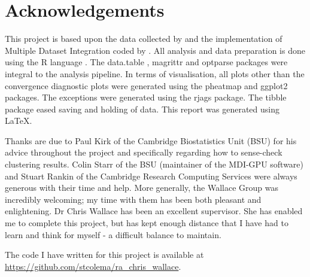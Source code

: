 \documentclass[12pt]{article} %
\begin{document}
	\newpage
	
	\section*{Acknowledgements}
	This project is based upon the data collected by \citet{TheInternationalIBDGeneticsConsortiumIBDriskloci2018} and the implementation of Multiple Dataset Integration coded by \citet{MasonMDIGPUacceleratingintegrative2016a}. All analysis and data preparation is done using the R language \citep{RCoreTeamLanguageEnvironmentStatistical2018}. The data.table \citep{DowleData.Table2019}, magrittr \citep{BacheMagrittr2014} and optparse \citep{DavisOptparse2019} packages were integral to the analysis pipeline. In terms of visualisation, all plots other than the convergence diagnostic plots were generated using the pheatmap \citep{KoldepheatmapPrettyHeatmaps2018} and ggplot2 \citep{WickhamGgplot22016} packages. The exceptions were generated using the rjags \citep{PlummerRjags2018} package. The tibble \citep{MullerTibble2019} package eased saving and holding of data. This report was generated using \LaTeX.
	
	Thanks are due to Paul Kirk of the Cambridge Biostatistics Unit (BSU) for his advice throughout the project and specifically regarding how to sense-check clustering results. Colin Starr of the BSU (maintainer of the MDI-GPU software) and Stuart Rankin of the Cambridge Research Computing Services were always generous with their time and help. More generally, the Wallace Group was incredibly welcoming; my time with them has been both pleasant and enlightening. Dr Chris Wallace has been an excellent supervisor. She has enabled me to complete this project, but has kept enough distance that I have had to learn and think for myself - a difficult balance to maintain.
	
	The code I have written for this project is available at \url{https://github.com/stcolema/ra_chris_wallace}.
	
	\newpage
	
	\tableofcontents
	
	\newpage
	
\end{document}
